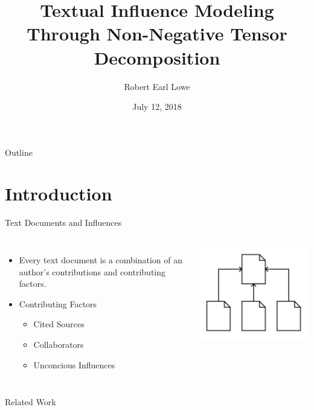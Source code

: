 \documentclass[handout]{beamer}
\title[Textual Influence Modeling]{Textual Influence Modeling Through Non-Negative Tensor Decomposition}
\author{Robert Earl Lowe}
\date[]{July 12, 2018}
\begin{document}

\begin{frame}
  \titlepage
\end{frame}

\begin{frame}{Outline}
  \tableofcontents
\end{frame}

\section{Introduction}
\begin{frame}{Text Documents and Influences}
\begin{columns}
\begin{itemize}[<+->]
  \item Every text document is a combination of an author's contributions and contributing factors.
  \item Contributing Factors
  \begin{itemize}
    \item Cited Sources
    \item Collaborators
    \item Unconcious Influences
  \end{itemize}
\end{itemize}
\includegraphics[width=\textwidth]{images/Citations}
\end{columns}
\end{frame}


\begin{frame}{Related Work}

\end{frame}
\end{document}
